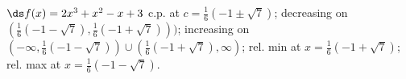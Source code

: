 {$\ds f(x) =2 x^3+x^2-x+3$
}
{c.p. at $c=\frac16(-1\pm\sqrt{7})$; 
decreasing on $(\frac16(-1-\sqrt{7}),\frac16(-1+\sqrt{7})))$;
increasing on $(-\infty,\frac16(-1-\sqrt{7})) \cup (\frac16(-1+\sqrt{7}),\infty)$;
rel. min at $x=\frac16(-1+\sqrt{7})$;
rel. max at $x=\frac16(-1-\sqrt{7})$.
}
